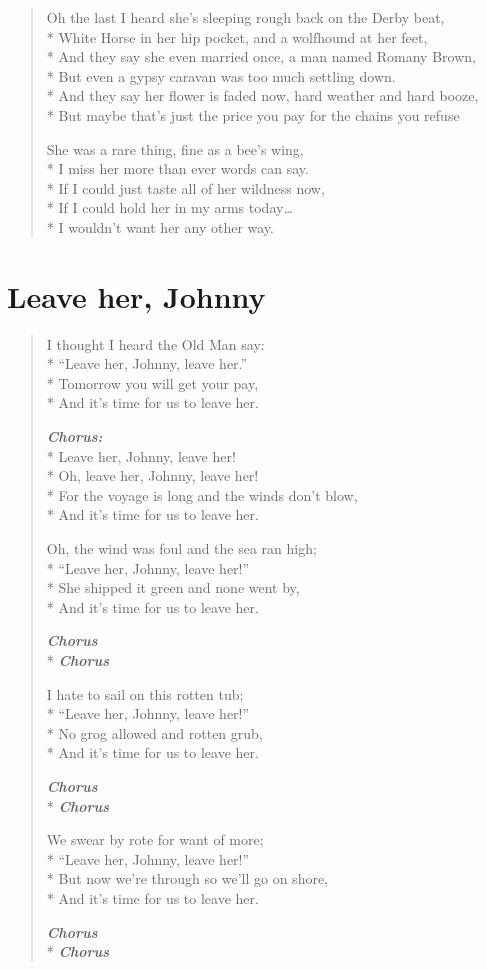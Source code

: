 \documentclass[9pt,twoside]{extarticle}
\makeatletter
\newenvironment{xverse}{
	\begin{verse}
	\fontsize{8.5}{10.5}\selectfont
}{
	\end{verse}
}
\newcommand{\chorusdef}{\textbf{\emph{Chorus:}}\\*}
\newcommand{\chorus@mark}[1][1]{%
\textbf{\emph{Chorus \ifthenelse{\equal{#1}{1}}{}{$\times$ #1}}}%
}
\newcommand{\chorusmark}[1][1]{%
\ifvmode%
\vspace{-0.5\stanzaskip}%
\chorus@mark[#1]%
\vspace{-0.5\stanzaskip}%
\else \\*%
\chorus@mark[#1]%
\fi%
}
\makeatother
\begin{document}
\begin{xverse}
Oh the last I heard she’s sleeping rough back on the Derby beat, \\*
White Horse in her hip pocket, and a wolfhound at her feet, \\*
And they say she even married once, a man named Romany Brown, \\*
But even a gypsy caravan was too much settling down. \\*
And they say her flower is faded now, hard weather and hard booze, \\*
But maybe that’s just the price you pay for the chains you refuse

She was a rare thing, fine as a bee’s wing, \\*
I miss her more than ever words can say. \\*
If I could just taste all of her wildness now, \\*
If I could hold her in my arms today… \\*
I wouldn’t want her any other way.
\end{xverse}

\section{Leave her, Johnny}

\begin{xverse}
I thought I heard the Old Man say: \\*
“Leave her, Johnny, leave her.” \\*
Tomorrow you will get your pay, \\*
And it’s time for us to leave her.

\chorusdef
Leave her, Johnny, leave her! \\*
Oh, leave her, Johnny, leave her! \\*
For the voyage is long and the winds don’t blow, \\*
And it’s time for us to leave her.

Oh, the wind was foul and the sea ran high; \\*
“Leave her, Johnny, leave her!” \\*
She shipped it green and none went by, \\*
And it’s time for us to leave her.

\chorusmark

I hate to sail on this rotten tub; \\*
“Leave her, Johnny, leave her!” \\*
No grog allowed and rotten grub, \\*
And it’s time for us to leave her.

\chorusmark

We swear by rote for want of more; \\*
“Leave her, Johnny, leave her!” \\*
But now we’re through so we’ll go on shore, \\*
And it’s time for us to leave her.

\chorusmark
\end{xverse}
\end{document}
